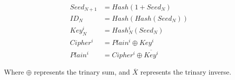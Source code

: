 \documentclass[]{slides}
\begin{document}
\begin{align}
Seed_{N+1} &= Hash ( 1 + Seed_N) \\
ID_N &= Hash(Hash(Seed_N) ) \\
Key_{N}^i &= Hash_{N}^i(Seed_N) \\
Cipher^i &= Plain^i \oplus Key^i \\
Plain^i &= Cipher^i \oplus \overline{Key^i}
\end{align}

Where $\oplus$ represents the trinary sum, and $\overline{X}$ represents the trinary inverse.
\end{document}
